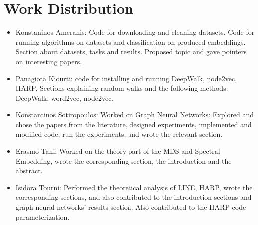 \section{Work Distribution}
\begin{itemize}
\item Konstaninos Ameranis: Code for downloading and cleaning datasets. Code for running algorithms
on datasets and classification on produced embeddings. Section about datasets, tasks and
results. Proposed topic and gave pointers on interesting papers.
\item Panagiota Kiourti: code for installing and running DeepWalk, node2vec, HARP. Sections explaining random walks and the following methods: DeepWalk, word2vec, 
node2vec.
\item Konstantinos Sotiropoulos: Worked on Graph Neural Networks: Explored and chose the papers from the literature, designed experiments, implemented and modified code, run the experiments, and wrote the relevant section. 
\item Erasmo Tani: Worked on the theory part of the MDS and Spectral Embedding, wrote the corresponding section, the introduction and the abstract.
\item Isidora Tourni: Performed the theoretical analysis of LINE, HARP, wrote the corresponding sections, and also contributed to the introduction sections and graph neural networks' results section. Also contributed to the HARP code parameterization.
\end{itemize}
